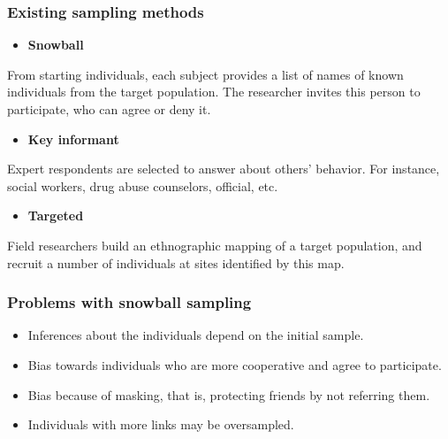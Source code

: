 \documentclass{beamer}
\newcommand{\Space}{\vspace{3ex}}
\begin{document}
\begin{frame}
    
    \frametitle{Existing sampling methods}

    \begin{itemize}
        \item {\bf Snowball} \cite{goodman1961}
    \end{itemize}

    From starting individuals, each subject provides a list of names of known
    individuals from the target population. The researcher invites this person
    to participate, who can agree or deny it. 

    \Space

    \begin{itemize}
      \item {\bf Key informant} \cite{deaux-callaghan1985}
    \end{itemize}

    Expert respondents are selected to answer about others' behavior. For
    instance, social workers, drug abuse counselors, official, etc. 

    \Space

    \begin{itemize}
      \item {\bf Targeted} \cite{watters-biernacki1989}
    \end{itemize}

   Field researchers build an ethnographic mapping of a target population, and
   recruit a number of individuals at sites identified by this map.

\end{frame}

\begin{frame}

  \frametitle{Problems with snowball sampling}

  \begin{itemize}
    \item Inferences about the individuals depend on the initial sample. 
    \item Bias towards individuals who are more cooperative and agree to
    participate. 
    \item Bias because of masking, that is, protecting friends by not
    referring them. 
    \item Individuals with more links may be oversampled.  
  \end{itemize}
  
\end{frame}
\end{document}
